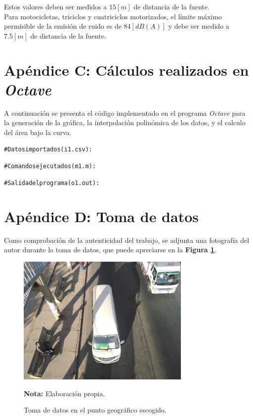 \documentclass[letter,11pt]{article}
\newcommand{\source}[1]{\vspace{-11pt} \caption*{\small{\textbf{Nota:} {#1}}}}
\begin{document}
\begin{enumerate}
Estos valores deben ser medidos a $15 [m]$ de distancia de la fuente. \\

Para motocicletas, triciclos y cuatriciclos motorizados, el límite máximo
permisible de la emisión de ruido es de $84 [dB(A)]$ y debe ser medido a
$7.5 [m]$ de distancia de la fuente.
\end{enumerate}

\newpage
\section*{Apéndice C: Cálculos realizados en \emph{Octave}}

A continuación se presenta el código implementado en el programa \emph{Octave}
para la generación de la gráfica, la interpolación polinómica de los datos, y
el calculo del área bajo la curva.

\begin{shaded}
\begin{alltt}
\footnotesize
\# Datos importados (i1.csv):


\# Comandos ejecutados (m1.m):


\# Salida del programa (o1.out):

\normalsize
\end{alltt}
\end{shaded}

\newpage
\section*{Apéndice D: Toma de datos}

Como comprobación de la autenticidad del trabajo, se adjunta una fotografía del
autor durante la toma de datos, que puede apreciarse en la
\textbf{Figura \ref{figura7}}.

\begin{figure}
\centering
\includegraphics[width=0.75\textwidth]{resources/f7.eps}
\caption{Toma de datos en el punto geográfico escogido.}
\label{figura7}
\source{Elaboración propia.}
\end{figure}
\end{document}
